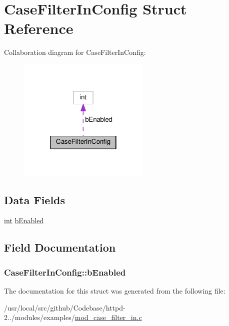 \hypertarget{structCaseFilterInConfig}{}\section{Case\+Filter\+In\+Config Struct Reference}
\label{structCaseFilterInConfig}


Collaboration diagram for Case\+Filter\+In\+Config\+:
\nopagebreak
\begin{figure}[H]
\begin{center}
\leavevmode
\includegraphics[width=178pt]{structCaseFilterInConfig__coll__graph}
\end{center}
\end{figure}
\subsection*{Data Fields}
\begin{DoxyCompactItemize}
\item 
\hyperlink{pcre_8txt_a42dfa4ff673c82d8efe7144098fbc198}{int} \hyperlink{structCaseFilterInConfig_a6ff66432907c31af684ece4672cc6251}{b\+Enabled}
\end{DoxyCompactItemize}


\subsection{Field Documentation}
\subsubsection[{\texorpdfstring{b\+Enabled}{bEnabled}}]{ Case\+Filter\+In\+Config\+::b\+Enabled}\hypertarget{structCaseFilterInConfig_a6ff66432907c31af684ece4672cc6251}{}\label{structCaseFilterInConfig_a6ff66432907c31af684ece4672cc6251}


The documentation for this struct was generated from the following file\+:\begin{DoxyCompactItemize}
\item 
/usr/local/src/github/\+Codebase/httpd-\/2../modules/examples/\hyperlink{mod__case__filter__in_8c}{mod\+\_\+case\+\_\+filter\+\_\+in.\+c}\end{DoxyCompactItemize}
